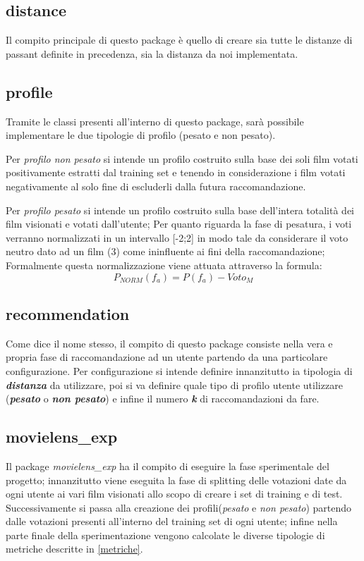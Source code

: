 \subsection{distance}
Il compito principale di questo package è quello di creare sia tutte le distanze di passant definite in precedenza, sia la distanza da noi implementata.
\subsection{profile}
Tramite le classi presenti all'interno di questo package, sarà possibile implementare le due tipologie di profilo (pesato e non pesato).

Per \emph{profilo non pesato} si intende un profilo costruito sulla base dei soli film votati positivamente estratti dal training set e tenendo in considerazione i film votati negativamente al solo fine di escluderli dalla futura raccomandazione.

Per \emph{profilo pesato} si intende un profilo costruito sulla base dell'intera totalità dei film visionati e votati dall'utente; Per quanto riguarda la fase di pesatura, i voti verranno normalizzati in un intervallo [-2;2] in modo tale da considerare il voto neutro dato ad un film (3) come ininfluente ai fini della raccomandazione; Formalmente questa normalizzazione viene attuata attraverso la formula:
$$
P_{NORM}(f_a) = P(f_a)- Voto_M
$$
\subsection{recommendation}
Come dice il nome stesso, il compito di questo package consiste nella vera e propria fase di raccomandazione ad un utente partendo da una particolare configurazione. Per configurazione si intende definire innanzitutto ia tipologia di \emph{\textbf{distanza}} da utilizzare, poi si va definire quale tipo di profilo utente utilizzare (\emph{\textbf{pesato}} o \emph{\textbf{non pesato}}) e infine il numero \emph{\textbf{k}} di raccomandazioni da fare.
\subsection{movielens\_exp}
Il package \emph{movielens\_exp} ha il compito di eseguire la fase sperimentale del progetto; innanzitutto viene eseguita la fase di splitting delle votazioni date da ogni utente ai vari film visionati allo scopo di creare i set di training e di test. Successivamente si passa alla creazione dei profili(\emph{pesato} e \emph{non pesato}) partendo dalle votazioni presenti all'interno del training set di ogni utente; infine nella parte finale della sperimentazione vengono calcolate le diverse tipologie di metriche descritte in \ref{metriche}.

